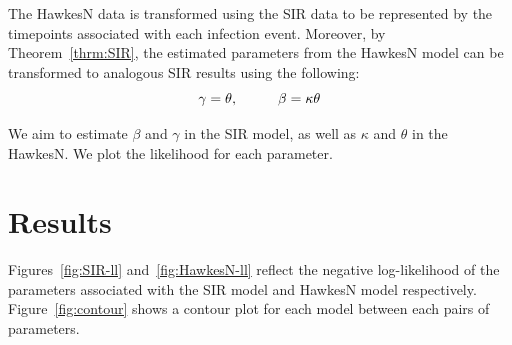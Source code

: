 \documentclass[12pt]{article}
\begin{document}
The HawkesN data is transformed using the SIR data to be represented by the timepoints associated with each infection event. Moreover, by Theorem~\ref{thrm:SIR}, the estimated parameters from the HawkesN model can be transformed to analogous SIR results using the following:
\[
\gamma = \theta, \hspace{10mm}
\beta = \kappa \theta
\]

We aim to estimate $\beta$ and $\gamma$ in the SIR model, as well as $\kappa$ and $\theta$ in the HawkesN. We plot the likelihood for each parameter. 




\section{Results}

Figures~\ref{fig:SIR-ll} and~\ref{fig:HawkesN-ll} reflect the negative log-likelihood of the parameters associated with the SIR model and HawkesN model respectively. Figure~\ref{fig:contour} shows a contour plot for each model between each pairs of parameters. 
\end{document}
